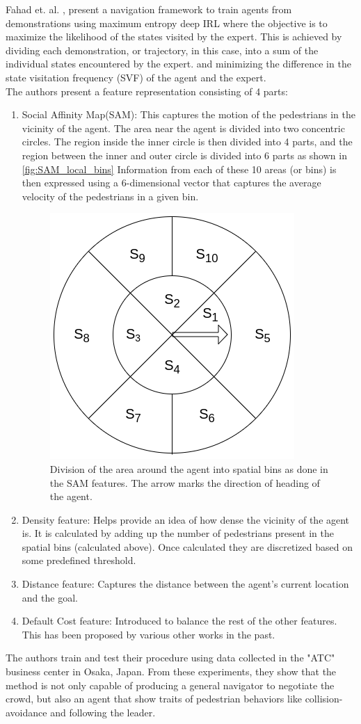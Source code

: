 Fahad et. al. \cite{fahad_learning_2018}, present a navigation framework to train agents from demonstrations using maximum entropy deep IRL where the objective is to maximize the likelihood of the states visited by the expert.
This is achieved by dividing each demonstration, or trajectory, in this case, into a sum of the individual states encountered by the expert. and minimizing the difference in the state visitation frequency (SVF) of the agent and the expert.\\
The authors present a feature representation consisting of 4 parts:
\begin{enumerate}
    \item Social Affinity Map(SAM): This captures the motion of the pedestrians in the vicinity of the agent. The area near the agent is divided into two concentric circles. The region inside the inner circle is then divided into 4 parts, and the region between the inner and outer circle is divided into 6 parts as shown in \autoref{fig:SAM_local_bins}
    Information from each of these 10 areas (or bins) is then expressed using a 6-dimensional vector that captures the average velocity of the pedestrians in a given bin. 
    \begin{figure}
    	\centering
    	\includegraphics[width=0.5\linewidth]{figures/SAM_local_bins.png}
    	\caption{Division of the area around the agent into spatial bins as done in the SAM features. The arrow marks the direction of heading of the agent.}
    	\label{fig:SAM_local_bins}
    \end{figure}
    \item Density feature: Helps provide an idea of how dense the vicinity of the agent is. It is calculated by adding up the number of pedestrians present in the spatial bins (calculated above). Once calculated they are discretized based on some predefined threshold.
    \item Distance feature: Captures the distance between the agent's current location and the goal.
    \item Default Cost feature: Introduced to balance the rest of the other features. This has been proposed by various other works in the past.
    
\end{enumerate}
The authors train and test their procedure using data collected in the "ATC" business center in Osaka, Japan.
From these experiments, they show that the method is not only capable of producing a general navigator to negotiate the crowd, but also an agent that show traits of pedestrian behaviors like collision-avoidance and following the leader.


